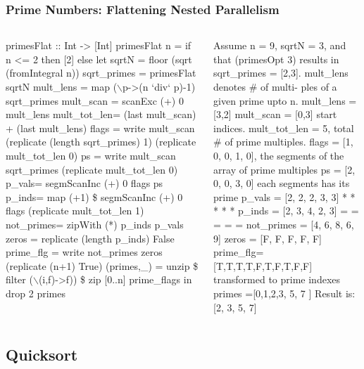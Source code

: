 \documentclass{beamer}
\newcommand{\mymath}[1]{$ #1 $}
\begin{document}
\begin{frame}[fragile,t]
  \frametitle{Prime Numbers: Flattening Nested Parallelism}
\vspace{-2ex}
\begin{columns}
\begin{colorcode}[fontsize=\scriptsize]
primesFlat :: Int -> [Int]
primesFlat n = if n <= 2 then [2] else 
 let sqrtN = floor (sqrt (fromIntegral n))
     sqrt_primes = primesFlat sqrtN
     mult_lens   = map (\mymath{\backslash}p->(n `div` p)-1) 
                   sqrt_primes
     mult_scan   = scanExc (+) 0 mult_lens 
     mult_tot_len= (last mult_scan) + 
                   (last mult_lens)
     flags = write mult_scan 
          (replicate (length sqrt_primes) 1) 
          (replicate mult_tot_len 0)
     ps    = write mult_scan sqrt_primes              
                  (replicate mult_tot_len 0)
     p_vals= segmScanInc (+) 0 flags ps
     p_inds= map (+1) \$ segmScanInc (+) 0 flags 
                  (replicate mult_tot_len 1)
     not_primes= zipWith (*) p_inds p_vals
     zeros = replicate (length p_inds) False 
     prime_flg  = write not_primes zeros 
                  (replicate (n+1) True)
     (primes,_) = unzip \$ filter (\mymath{\backslash}(i,f)->f)) 
                    \$ zip [0..n] prime_flags
 in drop 2 primes
\end{colorcode}
\begin{colorcode}[fontsize=\scriptsize]
Assume n = 9, sqrtN = 3, and 
that (primesOpt 3) results in 
sqrt_primes = [2,3].
mult_lens denotes \# of multi-
  ples of a given prime upto n.
mult_lens = [3,2]
mult_scan = [0,3] start indices.
mult_tot_len = 5, total \# of 
  prime multiples.
flags      = [1, 0, 0, 1, 0],
  the segments of the array
        of prime multiples
ps         = [2, 0, 0, 3, 0]
  each segments has its prime
p_vals     = [2, 2, 2, 3, 3]
              *  *  *  *  *
p_inds     = [2, 3, 4, 2, 3]
              =  =  =  =  =
not_primes = [4, 6, 8, 6, 9]
zeros     = [F, F, F, F, F]
prime_flg=[T,T,T,T,F,T,F,T,F,F]
  transformed to prime indexes
primes   =[0,1,2,3,  5,  7    ]
\alert{Result is: [2, 3, 5, 7]}
\end{colorcode}
\end{columns}
\medskip

\end{frame}

\subsection{Quicksort}
\end{document}
